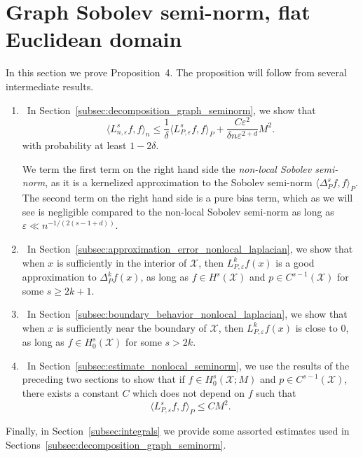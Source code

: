 \documentclass[aos]{imsart}
\theoremstyle{plain}
\theoremstyle{definition}
\theoremstyle{remark}
\newcommand{\dotp}[2]{\langle #1, #2 \rangle}
\newcommand{\mc}[1]{\mathcal{#1}}
\newcommand{\1}{\mathbf{1}}
\begin{document}
\section{Graph Sobolev semi-norm, flat Euclidean domain}
\label{sec:graph_quadratic_form_euclidean}
In this section we prove Proposition~4. The proposition will follow from several intermediate results.
\begin{enumerate}
	\item~In Section~\ref{subsec:decomposition_graph_seminorm}, we show that
	\begin{equation}
	\label{pf:graph_seminorm_ho_1}
	\dotp{L_{n,\varepsilon}^sf}{f}_n \leq \frac{1}{\delta} \dotp{L_{P,\varepsilon}^sf}{f}_{P} + \frac{C\varepsilon^2}{\delta n\varepsilon^{2 + d}}M^2.
	\end{equation}
	with probability at least $1 - 2\delta$. 
	
	We term the first term on the right hand side the \emph{non-local Sobolev semi-norm}, as it is a kernelized approximation to the Sobolev semi-norm $\dotp{\Delta_P^sf}{f}_{P}$. The second term on the right hand side is a pure bias term, which as we will see is negligible compared to the non-local Sobolev semi-norm as long as $\varepsilon \ll n^{-1/(2(s -1 + d))}$. 
	\item~In Section~\ref{subsec:approximation_error_nonlocal_laplacian}, we show that when $x$ is sufficiently in the interior of $\mc{X}$, then $L_{P,\varepsilon}^kf(x)$ is a good approximation to $\Delta_P^kf(x)$, as long as $f \in H^{s}(\mc{X})$ and $p \in C^{s - 1}(\mc{X})$ for some $s \geq 2k + 1$. 
	\item~In Section~\ref{subsec:boundary_behavior_nonlocal_laplacian}, we show that when $x$ is sufficiently near the boundary of $\mc{X}$, then $L_{P,\varepsilon}^kf(x)$ is close to $0$, as long as $f \in H_0^{s}(\mc{X})$ for some $s > 2k$.
	\item~In Section~\ref{subsec:estimate_nonlocal_seminorm}, we use the results of the preceding two sections to show that if $f \in H_0^s(\mc{X};M)$ and $p \in C^{s - 1}(\mc{X})$, there exists a constant $C$ which does not depend on $f$ such that
	\begin{equation}
	\label{pf:graph_seminorm_ho_2}
	\dotp{L_{P,\varepsilon}^sf}{f}_{P} \leq CM^2.
	\end{equation}
\end{enumerate}
Finally, in Section~\ref{subsec:integrals} we provide some assorted estimates used in Sections~\ref{subsec:decomposition_graph_seminorm}. 
\end{document}
